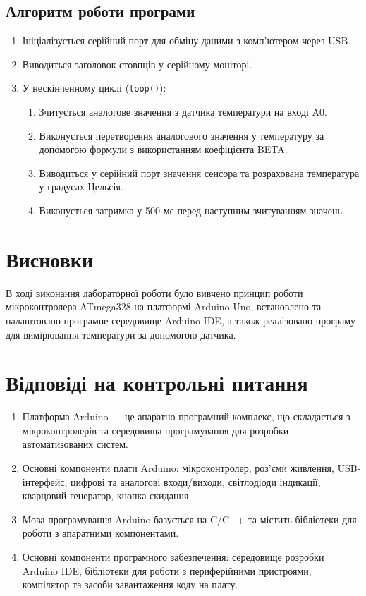 \documentclass[a4paper]{article}
\begin{document}
\subsection*{Алгоритм роботи програми}
\begin{enumerate}
    \item Ініціалізується серійний порт для обміну даними з комп'ютером через USB.
    \item Виводиться заголовок стовпців у серійному моніторі.
    \item У нескінченному циклі (\texttt{loop()}):
    \begin{enumerate}
        \item Зчитується аналогове значення з датчика температури на вході A0.
        \item Виконується перетворення аналогового значення у температуру за допомогою формули з використанням коефіцієнта BETA.
        \item Виводиться у серійний порт значення сенсора та розрахована температура у градусах Цельсія.
        \item Виконується затримка у 500 мс перед наступним зчитуванням значень.
    \end{enumerate}
\end{enumerate}

\section*{Висновки}
В ході виконання лабораторної роботи було вивчено принцип роботи мікроконтролера ATmega328 на платформі Arduino Uno, встановлено та налаштовано програмне середовище Arduino IDE, а також реалізовано програму для вимірювання температури за допомогою датчика.

\section*{Відповіді на контрольні питання}
\begin{enumerate}
    \item Платформа Arduino — це апаратно-програмний комплекс, що складається з мікроконтролерів та середовища програмування для розробки автоматизованих систем.
    \item Основні компоненти плати Arduino: мікроконтролер, роз'єми живлення, USB-інтерфейс, цифрові та аналогові входи/виходи, світлодіоди індикації, кварцовий генератор, кнопка скидання.
    \item Мова програмування Arduino базується на C/C++ та містить бібліотеки для роботи з апаратними компонентами.
    \item Основні компоненти програмного забезпечення: середовище розробки Arduino IDE, бібліотеки для роботи з периферійними пристроями, компілятор та засоби завантаження коду на плату.
\end{enumerate}


    
\end{document}
